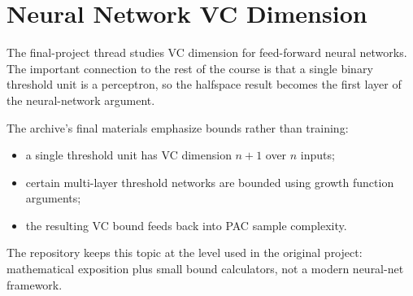\section{Neural Network VC Dimension}

The final-project thread studies VC dimension for feed-forward neural networks.
The important connection to the rest of the course is that a single binary
threshold unit is a perceptron, so the halfspace result becomes the first layer
of the neural-network argument.

The archive's final materials emphasize bounds rather than training:

\begin{itemize}
  \item a single threshold unit has VC dimension $n+1$ over $n$ inputs;
  \item certain multi-layer threshold networks are bounded using growth
        function arguments;
  \item the resulting VC bound feeds back into PAC sample complexity.
\end{itemize}

The repository keeps this topic at the level used in the original project:
mathematical exposition plus small bound calculators, not a modern neural-net
framework.

